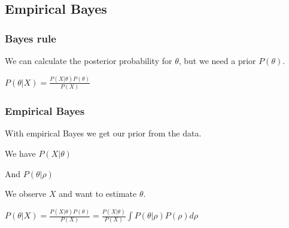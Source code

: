 
\subsection{Empirical Bayes}

\subsubsection{Bayes rule}

We can calculate the posterior probability for \(\theta \), but we need a prior \(P(\theta )\).

\(P(\theta | X)=\frac{P(X|\theta )P(\theta )}{P(X)}\)

\subsubsection{Empirical Bayes}

With empirical Bayes we get our prior from the data.

We have \(P(X|\theta )\)

And \(P(\theta |\rho )\)

We observe \(X\) and want to estimate \(\theta \).

\(P(\theta |X)=\frac{P(X|\theta)P(\theta )}{P(X)}=\frac{P(X|\theta)}{P(X)}\int P(\theta | \rho )P(\rho )d\rho \)

